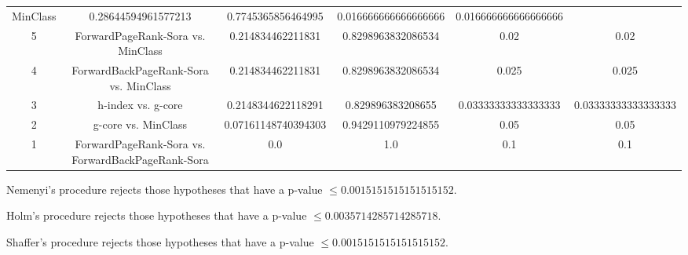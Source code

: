 \documentclass[a4paper,10pt]{article}
\begin{document}
\begin{landscape}
\begin{table}[!htp]
\begin{tabular}{cccccc}
MinClass&0.28644594961577213&0.7745365856464995&0.016666666666666666&0.016666666666666666\\5&ForwardPageRank-Sora vs. MinClass&0.214834462211831&0.8298963832086534&0.02&0.02\\4&ForwardBackPageRank-Sora vs. MinClass&0.214834462211831&0.8298963832086534&0.025&0.025\\3&h-index vs. g-core&0.2148344622118291&0.829896383208655&0.03333333333333333&0.03333333333333333\\2&g-core vs. MinClass&0.07161148740394303&0.9429110979224855&0.05&0.05\\1&ForwardPageRank-Sora vs. ForwardBackPageRank-Sora&0.0&1.0&0.1&0.1\\\hline
\end{tabular}
\end{table}
Nemenyi's procedure rejects those hypotheses that have a p-value $\le0.0015151515151515152$.


Holm's procedure rejects those hypotheses that have a p-value $\le0.0035714285714285718$.


Shaffer's procedure rejects those hypotheses that have a p-value $\le0.0015151515151515152$.



\end{landscape}
\end{document}
